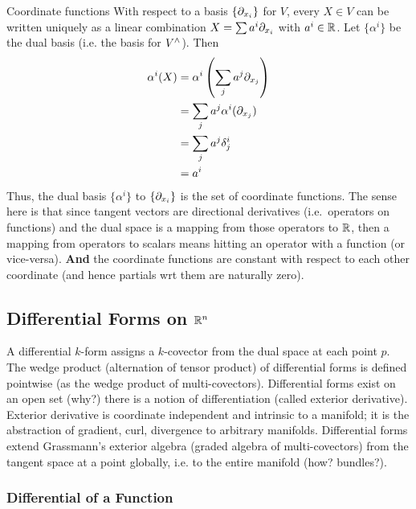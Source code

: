 %
\begin{example}{Coordinate functions}{}
    With respect to a basis \(\{\partial_{x_{i}}\}\) for \(V\), every \(X \in V\) can be written uniquely as a linear combination \(X = \sum a^i \partial_{x_i}\) with \(a^i \in \mathbb{R}\). Let \(\{\alpha^i\}\) be the dual basis (i.e. the basis for \(V^\wedge\)).
    Then
    \begin{align*}
        \alpha^i(X) & = \alpha^i \left( \sum_j a^j \partial_{x_{j}} \right) \\
                    & = \sum_j a^j \alpha^i(\partial_{x_{j}})               \\
                    & = \sum_j a^j \delta_j^i                      \\
                    & = a^i
    \end{align*}
    Thus, the dual basis \(\{\alpha^i\}\) to \(\{\partial_{x_{i}}\}\) is the set of coordinate functions.
    The sense here is that since tangent vectors are directional derivatives (i.e.\ operators on functions) and the dual space is a mapping from those operators to \(\mathbb{R}\), then a mapping from operators to scalars means hitting an operator with a function (or vice-versa). \textbf{And} the coordinate functions are constant with respect to each other coordinate (and hence partials wrt them are naturally zero).
\end{example}

\subsection{Differential Forms on \(\mathbb{R}^n\)}

A differential \(k\)-form assigns a \(k\)-covector from the dual space at each point \(p\).
%
The wedge product (alternation of tensor product) of differential forms is defined pointwise (as the wedge product of multi-covectors).
%
Differential forms exist on an open set (why?) there is a notion of differentiation (called exterior derivative).
%
Exterior derivative is coordinate independent and intrinsic to a manifold; it is the abstraction of gradient, curl, divergence to arbitrary manifolds.
%
Differential forms extend Grassmann's exterior algebra (graded algebra of multi-covectors) from the tangent space at a point globally, i.e. to the entire manifold (how? bundles?).

\subsubsection{Differential of a Function}

